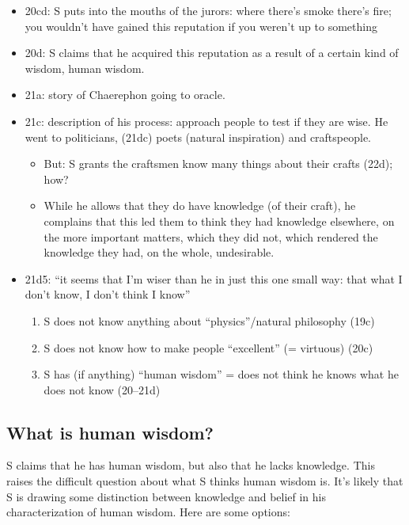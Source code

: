 \documentclass[oneside]{article}
\begin{document}
\begin{itemize}
\item 20cd: S puts into the mouths of the jurors: where there's smoke there's fire; you wouldn't have gained this reputation if you weren't up to something
\item 20d: S claims that he acquired this reputation as a result of a certain kind of wisdom, human wisdom.
\item	21a: story of Chaerephon going to oracle.
\item	21c: description of his process: approach people to test if they are wise. He went to politicians, (21dc) poets (natural inspiration) and craftspeople.
\begin{itemize} \item  But: S grants the craftsmen know many things about their crafts (22d); how? 
\item While he allows that they do have knowledge (of their craft), he complains that this led them to think they had knowledge elsewhere, on the more important matters, which they did not, which rendered the knowledge they had, on the whole, undesirable.
\end{itemize}
\item  21d5: ``it seems that I'm wiser than he in just this one small way: that what I don't know, I don't think I know''
\begin{enumerate}
\item S does not know anything about ``physics''/natural philosophy (19c)
\item S does not know how to make people ``excellent'' (= virtuous) (20c)
\item S has (if anything) ``human wisdom'' = does not think he knows what he does not know (20--21d)
\end{enumerate}
\end{itemize}


\subsection*{What is human wisdom?}
S claims that he has human wisdom, but also that he lacks knowledge. This raises the difficult question about what S thinks human wisdom is. It's likely that S is drawing some distinction between knowledge and belief in his characterization of human wisdom. Here are some options:
\end{document}
